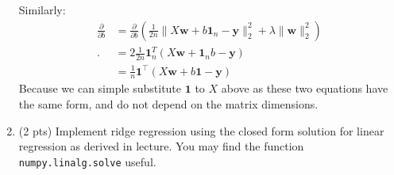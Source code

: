 \documentclass[10pt,letter,notitlepage]{article}
\newcommand{\one}{\mathbf{1}}
\newcommand{\wv}{\mathbf{w}}
\newcommand{\yv}{\mathbf{y}}
\newcounter{exercise}
\begin{document}
\begin{exercise}
\begin{enumerate}
{      Similarly:
      \begin{align*}
        \frac{\partial}{\partial b} &= \frac{\partial}{\partial b} \left(\tfrac{1}{2n} \|X \wv+ b\one_n - \yv\|_2^2 + \lambda \|\wv\|_2^2\right) \\.
        &= 2 \tfrac{1}{2n} \one_n^T(X \wv+ \one_nb - \yv)\\
        &= \tfrac1n \one^\top (X\wv + b\one - \yv)
      \end{align*}
      Because we can simple substitute $\one$ to $X$ above as these two equations have the same form, and do not depend on the matrix dimensions. 
    } 

  \item (2 pts) Implement ridge regression using the closed form solution for linear regression as derived in lecture. 
    You may find the function \texttt{numpy.linalg.solve} useful.


\end{enumerate}
\end{exercise}
\end{document}
